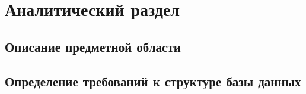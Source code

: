 \chapter{Аналитический раздел}
\label{cha:analysis}
%
%

\section{Описание предметной области}





\section{Определение требований к структуре базы данных}



